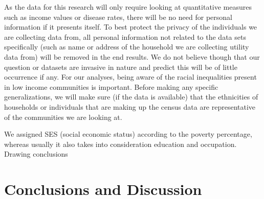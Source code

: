 \documentclass[11pt]{article}
\begin{document}
    As the data for this research will only require looking at quantitative
measures such as income values or disease rates, there will be no need
for personal information if it presents itself. To best protect the
privacy of the individuals we are collecting data from, all personal
information not related to the data sets specifically (such as name or
address of the household we are collecting utility data from) will be
removed in the end results. We do not believe though that our question
or datasets are invasive in nature and predict this will be of little
occurrence if any. For our analyses, being aware of the racial
inequalities present in low income communities is important. Before
making any specific generalizations, we will make sure (if the data is
available) that the ethnicities of households or individuals that are
making up the census data are representative of the communities we are
looking at.

We assigned SES (social economic status) according to the poverty
percentage, whereas usually it also takes into consideration education
and occupation. Drawing conclusions

    \hypertarget{conclusions-and-discussion}{%
\section{Conclusions and Discussion}\label{conclusions-and-discussion}}


    
    
    
    
\end{document}
